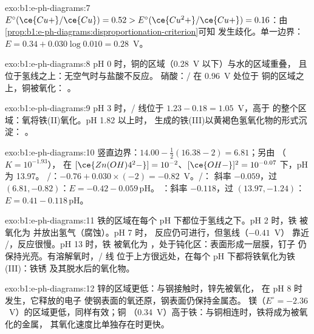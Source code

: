 \begin{solution}{exo:b1:e-ph-diagrams:7}
$E^\circ(\ce{Cu+}/\ce{Cu}) = 0.52 > E^\circ(\ce{Cu^2+}/\ce{Cu+}) = 0.16$：由
\cref{prop:b1:e-ph-diagrams:disproportionation-criterion}可知 
发生歧化。单一边界：$E = 0.34 + 0.030\log 0.010 =
0.28$~V。
\end{solution}

\begin{solution}{exo:b1:e-ph-diagrams:8}
pH 0 时，铜的区域（0.28~V 以下）与水的区域重叠，
且位于氢线之上：无空气时与盐酸不反应。
硝酸：/ 在 0.96~V 处位于
铜的区域之上，铜被氧化：
。
\end{solution}

\begin{solution}{exo:b1:e-ph-diagrams:9}
pH 3 时，/ 线位于 $1.23 - 0.18 = 1.05$~V，高于
 的整个区域：氧将铁(II)氧化。pH 1.82 以上时，
生成的铁(III)以黄褐色氢氧化物的形式沉淀：
。
\end{solution}

\begin{solution}{exo:b1:e-ph-diagrams:10}
竖直边界：$14.00 - \frac12(16.38 - 2) = 6.81$；另由
（$K = 10^{-1.93}$），
在 $[\ce{Zn(OH)4^2-}] = 10^{-2}$、$[\ce{OH-}]^2 = 10^{-0.07}$ 下，pH 为 13.97。
/：$-0.76 + 0.030 \times (-2) = -0.82$~V。/：
斜率 $-0.059$，过 $(6.81, -0.82)$：$E = -0.42 - 0.059\,\mathrm{pH}$。
：斜率 $-0.118$，过
$(13.97, -1.24)$：$E = 0.41 - 0.118\,\mathrm{pH}$。
\end{solution}

\begin{solution}{exo:b1:e-ph-diagrams:11}
铁的区域在每个 pH 下都位于氢线之下。pH 2 时，铁
被氧化为  并放出氢气（腐蚀）。pH 7 时，
反应仍可进行，但氢线（$-0.41$~V）
靠近 /，反应很慢。pH 13 时，铁
被氧化为 ，处于钝化区：表面形成一层膜，钉子
仍保持光亮。有溶解氧时，/ 线
位于上方很远处，在每个 pH 下都将铁氧化为铁(III)：铁锈 
及其脱水后的氧化物。
\end{solution}

\begin{solution}{exo:b1:e-ph-diagrams:12}
锌的区域更低：与钢接触时，锌先被氧化，
 在 pH 8 时发生，它释放的电子
使钢表面的氧还原，钢表面仍保持金属态。
镁（$E^\circ = -2.36$~V）的区域更低，同样有效；铜
（0.34~V）高于铁：与铜相连时，铁将成为被氧化的金属，
其氧化速度比单独存在时更快。
\end{solution}

